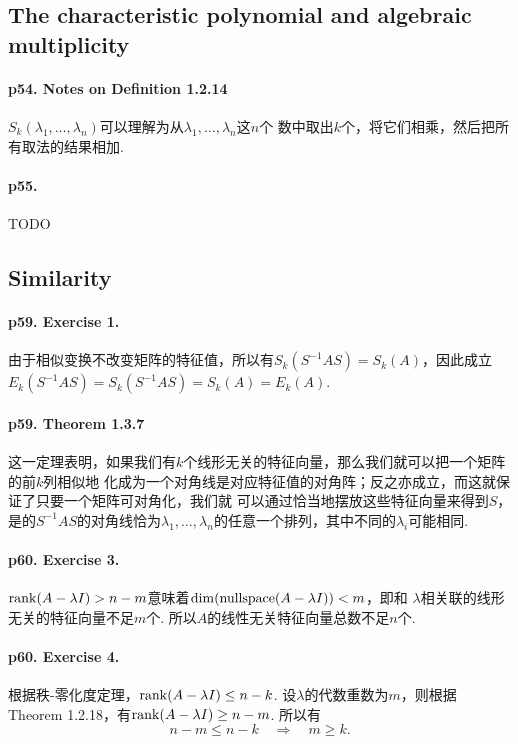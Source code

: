 \subsection{The characteristic polynomial and algebraic multiplicity}
  \paragraph{p54. Notes on Definition 1.2.14}
    $S_k(\lambda_1,\dots,\lambda_n)$可以理解为从$\lambda_1,\dots,\lambda_n$这$n$个
    数中取出$k$个，将它们相乘，然后把所有取法的结果相加. 
  \paragraph{p55. } TODO
\subsection{Similarity}
  \paragraph{p59. Exercise 1.}
    由于相似变换不改变矩阵的特征值，所以有$S_k(S^{-1}AS)=S_k(A)$，因此成立$E_k(S^{-1}A
    S)=S_{k}(S^{-1}AS)=S_k(A)=E_k(A)$. 

  \paragraph{p59. Theorem 1.3.7}
    这一定理表明，如果我们有$k$个线形无关的特征向量，那么我们就可以把一个矩阵的前$k$列相似地
    化成为一个对角线是对应特征值的对角阵；反之亦成立，而这就保证了只要一个矩阵可对角化，我们就
    可以通过恰当地摆放这些特征向量来得到$S$，是的$S^{-1}AS$的对角线恰为$\lambda_1,\dots,
    \lambda_n$的任意一个排列，其中不同的$\lambda_i$可能相同. 


  \paragraph{p60. Exercise 3.}
    $\operatorname{rank}(A-\lambda I)>n-m$意味着$\dim(\operatorname{nullspace} (A-\lambda I)) < m$，即和
    $\lambda$相关联的线形无关的特征向量不足$m$个. 所以$A$的线性无关特征向量总数不足$n$个. 

  \paragraph{p60. Exercise 4.}
    根据秩-零化度定理，$\operatorname{rank}(A-\lambda I)\le n-k$. 设$\lambda$的代数重数为$m$，则根据
    Theorem 1.2.18，有$\operatorname{rank}(A-\lambda I)\ge n-m$. 所以有
    \[
      n-m \le n-k \quad\Rightarrow\quad m\ge k.
    \]

